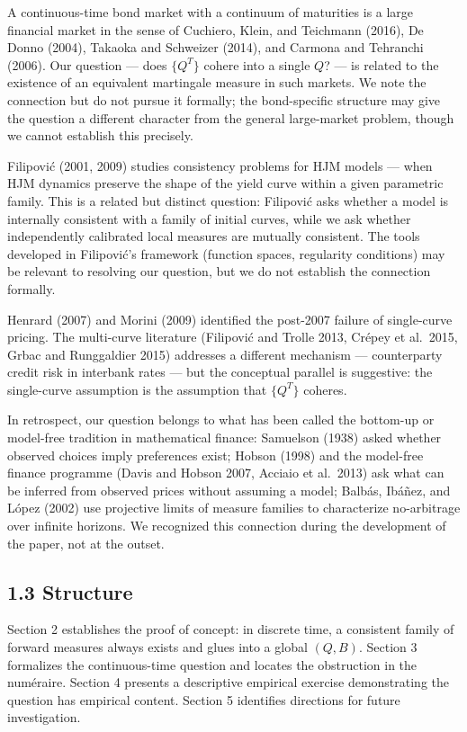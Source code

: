 \documentclass[
]{article}
\begin{document}
A continuous-time bond market with a continuum of maturities is a large
financial market in the sense of Cuchiero, Klein, and Teichmann (2016),
De Donno (2004), Takaoka and Schweizer (2014), and Carmona and Tehranchi
(2006). Our question --- does \(\{Q^T\}\) cohere into a single \(Q\)?
--- is related to the existence of an equivalent martingale measure in
such markets. We note the connection but do not pursue it formally; the
bond-specific structure may give the question a different character from
the general large-market problem, though we cannot establish this
precisely.

Filipović (2001, 2009) studies consistency problems for HJM models ---
when HJM dynamics preserve the shape of the yield curve within a given
parametric family. This is a related but distinct question: Filipović
asks whether a model is internally consistent with a family of initial
curves, while we ask whether independently calibrated local measures are
mutually consistent. The tools developed in Filipović's framework
(function spaces, regularity conditions) may be relevant to resolving
our question, but we do not establish the connection formally.

Henrard (2007) and Morini (2009) identified the post-2007 failure of
single-curve pricing. The multi-curve literature (Filipović and Trolle
2013, Crépey et al.~2015, Grbac and Runggaldier 2015) addresses a
different mechanism --- counterparty credit risk in interbank rates ---
but the conceptual parallel is suggestive: the single-curve assumption
is the assumption that \(\{Q^T\}\) coheres.

In retrospect, our question belongs to what has been called the
bottom-up or model-free tradition in mathematical finance: Samuelson
(1938) asked whether observed choices imply preferences exist; Hobson
(1998) and the model-free finance programme (Davis and Hobson 2007,
Acciaio et al.~2013) ask what can be inferred from observed prices
without assuming a model; Balbás, Ibáñez, and López (2002) use
projective limits of measure families to characterize no-arbitrage over
infinite horizons. We recognized this connection during the development
of the paper, not at the outset.

\subsection{1.3 Structure}\label{structure}

Section 2 establishes the proof of concept: in discrete time, a
consistent family of forward measures always exists and glues into a
global \((Q, B)\). Section 3 formalizes the continuous-time question and
locates the obstruction in the numéraire. Section 4 presents a
descriptive empirical exercise demonstrating the question has empirical
content. Section 5 identifies directions for future investigation.
\end{document}
